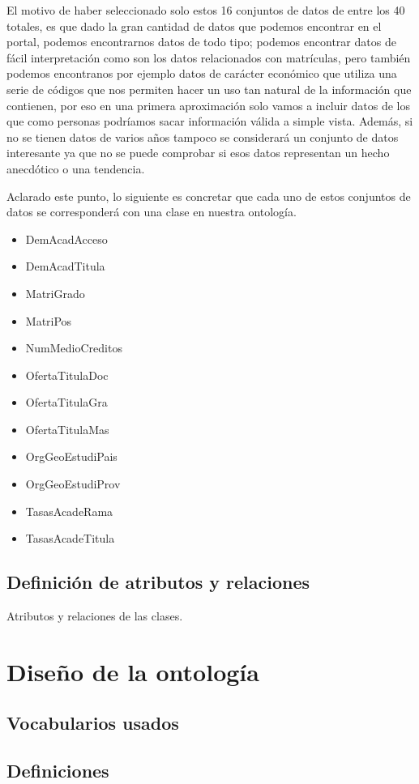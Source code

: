 El motivo de haber seleccionado solo estos 16 conjuntos de datos de entre los 40 totales, es que dado la gran cantidad de datos que podemos encontrar en el portal, podemos encontrarnos datos de todo tipo; podemos encontrar datos de fácil interpretación como son los datos relacionados con matrículas, pero también podemos encontranos por ejemplo datos de carácter económico que utiliza una serie de códigos que nos permiten hacer un uso tan natural de la información que contienen, por eso en una primera aproximación solo vamos a incluir datos de los que como personas podríamos sacar información válida a simple vista. Además, si no se tienen datos de varios años tampoco se considerará un conjunto de datos interesante ya que no se puede comprobar si esos datos representan un hecho anecdótico o una tendencia.

\bigskip

Aclarado este punto, lo siguiente es concretar que cada uno de estos conjuntos de datos se corresponderá con una clase en nuestra ontología.

\begin{itemize}
	\item DemAcadAcceso
	\item DemAcadTitula
	\item MatriGrado
	\item MatriPos
	\item NumMedioCreditos
	\item OfertaTitulaDoc
	\item OfertaTitulaGra
	\item OfertaTitulaMas
	\item OrgGeoEstudiPais
	\item OrgGeoEstudiProv
	\item TasasAcadeRama
	\item TasasAcadeTitula
\end{itemize}

\subsection{Definición de atributos y relaciones}

Atributos y relaciones de las clases.

\section{Diseño de la ontología}

\subsection{Vocabularios usados}

\subsection{Definiciones}